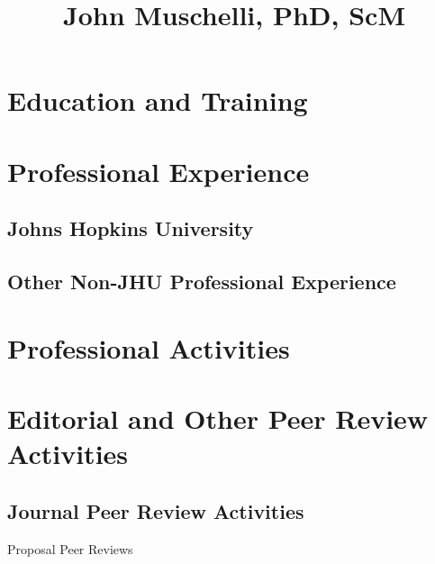 \documentclass[11pt,a4paper]{moderncv}
\title{John Muschelli, PhD, ScM}
\begin{document}


\maketitle
\vspace{-3em}





\section{Education and Training}



\section{Professional Experience}
\subsection{Johns Hopkins University}



\subsection{Other Non-JHU Professional Experience}
\vspace{1em}

\section{Professional Activities}



\section{Editorial and Other Peer Review Activities}

\subsection{Journal Peer Review Activities}


Proposal Peer Reviews 

\end{document}
